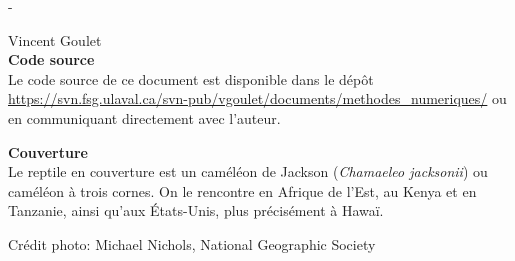 \begingroup
\calccentering{\unitlength}
\begin{adjustwidth*}{\unitlength}{-\unitlength}
  \setlength{\parindent}{0pt}
  \setlength{\parskip}{\baselineskip}

  {\textcopyright} {\year} Vincent Goulet \\

  

  \sloppy
  \textbf{Code source} \\
  Le code source de ce document est disponible dans le dépôt
    \url{https://svn.fsg.ulaval.ca/svn-pub/vgoulet/documents/methodes_numeriques/}
  ou en communiquant directement avec l'auteur.

  \fussy
  \textbf{Couverture} \\
  Le reptile en couverture est un caméléon de Jackson (\emph{Chamaeleo
    jacksonii}) ou caméléon à trois cornes. On le rencontre en Afrique
  de l'Est, au Kenya et en Tanzanie, ainsi qu'aux États-Unis, plus
  précisément à Hawaï.

  Crédit photo: Michael Nichols, National Geographic Society
\end{adjustwidth*}
\endgroup

